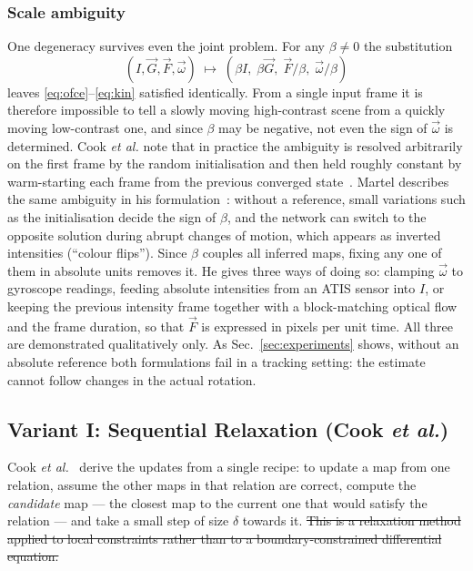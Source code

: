 \documentclass[journal]{IEEEtran}
\newcommand{\Imap}{I}
\newcommand{\Gmap}{\vec{G}}
\newcommand{\Fmap}{\vec{F}}
\newcommand{\wvec}{\vec{\omega}}
\begin{document}
\subsubsection{Scale ambiguity}
\label{sec:beta}
One degeneracy survives even the joint problem. For any $\beta\neq 0$ the
substitution
\begin{equation}
(\Imap,\Gmap,\Fmap,\wvec) \;\longmapsto\;
 (\beta\Imap,\;\beta\Gmap,\;\Fmap/\beta,\;\wvec/\beta)
\label{eq:beta}
\end{equation}
leaves \eqref{eq:ofce}--\eqref{eq:kin} satisfied identically. From a single
input frame it is therefore impossible to tell a slowly moving high-contrast
scene from a quickly moving low-contrast one, and since $\beta$ may be negative,
not even the sign of $\wvec$ is determined. Cook \emph{et al.} note that in
practice the ambiguity is resolved arbitrarily on the first frame by the random
initialisation and then held roughly constant by warm-starting each frame from
the previous converged state~\cite{cook2011}. Martel describes the same ambiguity in his formulation~\cite{martel2019thesis}:
without a reference, small variations such as the initialisation decide the sign
of $\beta$, and the network can switch to the opposite solution during abrupt
changes of motion, which appears as inverted intensities (``colour flips'').
Since $\beta$ couples all inferred maps, fixing any one of them in absolute
units removes it. He gives three ways of doing so: clamping $\wvec$ to
gyroscope readings, feeding absolute intensities from an ATIS sensor into
$\Imap$, or keeping the previous intensity frame together with a block-matching
optical flow and the frame duration, so that $\Fmap$ is expressed in pixels per
unit time. All three are demonstrated qualitatively only.
As Sec.~\ref{sec:experiments} shows, without an absolute reference both
formulations fail in a tracking setting: the estimate cannot follow changes in the actual rotation.


\subsection{Variant I: Sequential Relaxation (Cook \emph{et al.})}
\label{sec:cook}

Cook \emph{et al.}~\cite{cook2011,martel2015relational} derive the updates from a single recipe: to
update a map from one relation, assume the other maps in that relation are
correct, compute the \emph{candidate} map --- the closest map to the current one
that would satisfy the relation --- and take a small step of size $\delta$
towards it. \st{This is a relaxation method applied to local constraints rather than
to a boundary-constrained differential equation.}
\end{document}
